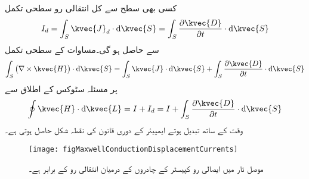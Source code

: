 کسی بھی سطح سے کل انتقالی رو سطحی تکمل
\begin{align}
I_d=\int_S \kvec{J}_d \cdot \dif \kvec{S}=\int_S \frac{\partial \kvec{D}}{\partial t} \cdot \dif \kvec{S}
\end{align}
سے حاصل ہو گی۔مساوات  کے سطحی تکمل
\begin{align*}
\int_S \left(\nabla \times \kvec{H} \right) \cdot \dif \kvec{S}=\int_S \kvec{J} \cdot \dif \kvec{S}+\int_S \frac{\partial \kvec{D}}{\partial t} \cdot \dif \kvec{S}
\end{align*}
پر مسئلہ سٹوکس کے اطلاق سے
\begin{align}
\oint \kvec{H} \cdot \dif \kvec{L}=I+I_d=I+\int_S \frac{\partial \kvec{D}}{\partial t} \cdot \dif \kvec{S}
\end{align}
 وقت کے ساتھ تبدیل ہوتے ایمپیئر کے دوری قانون کی نقطہ شکل حاصل ہوتی ہے۔

\begin{figure}
\centering
\texttt{[image: figMaxwellConductionDisplacementCurrents]}
\caption{موصل تار میں ایصالی رو کپیسٹر کے چادروں کے درمیان انتقالی رو کے برابر ہے۔}
\label{شکل_میکس_ویل_ایصالی_انتقالی_رو}
\end{figure}


